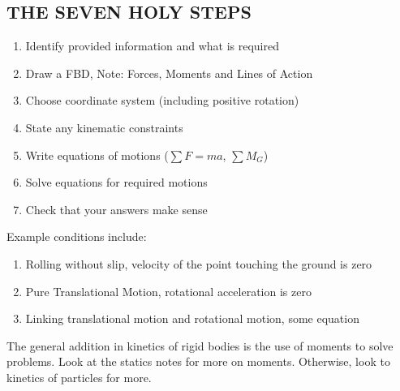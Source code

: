 \documentclass[a4paper, 12pt]{article}
\begin{document}
\subsection*{THE SEVEN HOLY STEPS}
\begin{enumerate}
  \item Identify provided information and what is required 
  \item Draw a FBD, Note: Forces, Moments and Lines of Action
  \item Choose coordinate system (including positive rotation)
  \item State any kinematic constraints
  \item Write equations of motions ($\sum F=ma$, $\sum M_G$) 
  \item Solve equations for required motions
  \item Check that your answers make sense 
\end{enumerate}

Example conditions include:
\begin{enumerate}
  \item Rolling without slip, velocity of the point touching the ground is zero
  \item Pure Translational Motion, rotational acceleration is zero
  \item Linking translational motion and rotational motion, some equation
\end{enumerate}
The general addition in kinetics of rigid bodies is the use of moments to solve problems.
Look at the statics notes for more on moments. Otherwise, look to kinetics of particles for more.
\end{document}
